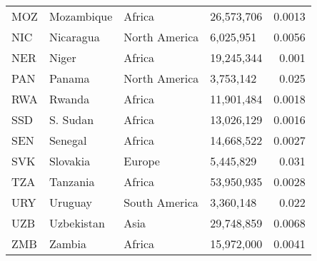 \begin{table}
\begin{tabular}{llllr}
        MOZ     & Mozambique      & Africa        & 26,573,706 & 0.0013        \\
        NIC     & Nicaragua       & North America & 6,025,951  & 0.0056        \\
        NER     & Niger           & Africa        & 19,245,344 & 0.001         \\
        PAN     & Panama          & North America & 3,753,142  & 0.025         \\
        RWA     & Rwanda          & Africa        & 11,901,484 & 0.0018        \\
        SSD     & S. Sudan        & Africa        & 13,026,129 & 0.0016        \\
        SEN     & Senegal         & Africa        & 14,668,522 & 0.0027        \\
        SVK     & Slovakia        & Europe        & 5,445,829  & 0.031         \\
        TZA     & Tanzania        & Africa        & 53,950,935 & 0.0028        \\
        URY     & Uruguay         & South America & 3,360,148  & 0.022         \\
        UZB     & Uzbekistan      & Asia          & 29,748,859 & 0.0068        \\
        ZMB     & Zambia          & Africa        & 15,972,000 & 0.0041        \\
        \bottomrule
    \end{tabular}
\end{table}
